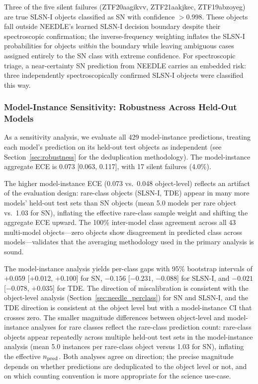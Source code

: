 \documentclass[twocolumn]{aastex631}
\begin{document}
Three of the five silent failures (ZTF20aagikvv, ZTF21aakjkec, ZTF19abzoyeg) are true SLSN-I objects classified as SN with confidence $> 0.998$. These objects fall outside NEEDLE's learned SLSN-I decision boundary despite their spectroscopic confirmation; the inverse-frequency weighting inflates the SLSN-I probabilities for objects \emph{within} the boundary while leaving ambiguous cases assigned entirely to the SN class with extreme confidence. For spectroscopic triage, a near-certainty SN prediction from NEEDLE carries an embedded risk: three independently spectroscopically confirmed SLSN-I objects were classified this way.

\subsubsection{Model-Instance Sensitivity: Robustness Across Held-Out Models}\label{sec:needle_sensitivity}\label{sec:needle_sens}

As a sensitivity analysis, we evaluate all 429 model-instance predictions, treating each model's prediction on its held-out test objects as independent (see Section~\ref{sec:robustness} for the deduplication methodology). The model-instance aggregate ECE is 0.073 [0.063, 0.117], with 17 silent failures (4.0\%).

The higher model-instance ECE (0.073 vs.\ 0.048 object-level) reflects an artifact of the evaluation design: rare-class objects (SLSN-I, TDE) appear in many more models' held-out test sets than SN objects (mean 5.0 models per rare object vs.\ 1.03 for SN), inflating the effective rare-class sample weight and shifting the aggregate ECE upward. The 100\% inter-model class agreement across all 43 multi-model objects---zero objects show disagreement in predicted class across models---validates that the averaging methodology used in the primary analysis is sound.

The model-instance analysis yields per-class gaps with 95\% bootstrap
intervals of $+0.059$ [$+0.012$, $+0.100$] for SN, $-0.156$ [$-0.231$,
$-0.088$] for SLSN-I, and $-0.021$ [$-0.078$, $+0.035$] for TDE. The
direction of miscalibration is consistent with the object-level analysis
(Section~\ref{sec:needle_perclass}) for SN and SLSN-I, and the TDE
direction is consistent at the object level but with a model-instance CI
that crosses zero. The smaller magnitude differences between object-level
and model-instance analyses for rare classes reflect the rare-class
prediction count: rare-class objects appear repeatedly across multiple
held-out test sets in the model-instance analysis (mean 5.0 instances
per rare-class object versus 1.03 for SN), inflating the effective
$n_{\rm pred}$. Both analyses agree on direction; the precise magnitude
depends on whether predictions are deduplicated to the object level or
not, and on which counting convention is more appropriate for the
science use-case.
\end{document}
